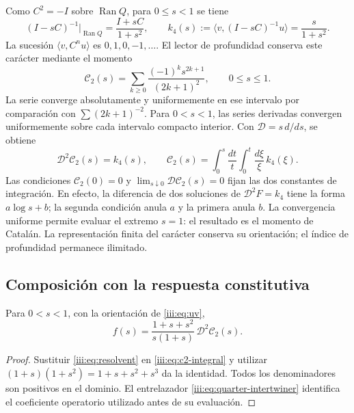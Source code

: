 Como $C^2=-I$ sobre $\operatorname{Ran}Q$, para $0\leq s<1$ se tiene
\begin{equation}
 (I-sC)^{-1}\big|_{\operatorname{Ran}Q}=\frac{I+sC}{1+s^2},
 \qquad k_4(s):=\langle v,(I-sC)^{-1}u\rangle=\frac{s}{1+s^2}.
 \label{iii:eq:resolvent}
\end{equation}
La sucesión $\langle v,C^nu\rangle$ es $0,1,0,-1,\ldots$. El lector
de profundidad conserva este carácter mediante el momento
\begin{equation}
 \mathcal C_2(s)=\sum_{k\geq0}\frac{(-1)^ks^{2k+1}}{(2k+1)^2},
 \qquad 0\leq s\leq1.
 \label{iii:eq:c2}
\end{equation}
La serie converge absolutamente y uniformemente en ese intervalo por
comparación con $\sum(2k+1)^{-2}$. Para $0<s<1$, las series derivadas
convergen uniformemente sobre cada intervalo compacto interior. Con
$\mathcal D=s\,d/ds$, se obtiene
\begin{equation}
 \mathcal D^2\mathcal C_2(s)=k_4(s),\qquad
 \mathcal C_2(s)=\int_0^s\frac{dt}{t}\int_0^t\frac{d\xi}{\xi}\,k_4(\xi).
 \label{iii:eq:c2-integral}
\end{equation}
Las condiciones $\mathcal C_2(0)=0$ y
$\lim_{s\downarrow0}\mathcal D\mathcal C_2(s)=0$ fijan las dos constantes
de integración. En efecto, la diferencia de dos soluciones de
$\mathcal D^2F=k_4$ tiene la forma $a\log s+b$; la segunda condición
anula $a$ y la primera anula $b$.
La convergencia uniforme permite evaluar el extremo $s=1$: el resultado es
el momento de Catalán. La representación finita del carácter conserva su
orientación; el índice de profundidad permanece ilimitado.

\subsection{Composición con la respuesta constitutiva}

\begin{theorem}
Para $0<s<1$, con la orientación de \eqref{iii:eq:uv},
\begin{equation}
 f(s)=\frac{1+s+s^2}{s(1+s)}\,\mathcal D^2\mathcal C_2(s).
 \label{iii:eq:catalan-vacuum}
\end{equation}
\end{theorem}
\begin{proof}
Sustituir \eqref{iii:eq:resolvent} en \eqref{iii:eq:c2-integral} y utilizar
$(1+s)(1+s^2)=1+s+s^2+s^3$ da la identidad. Todos los denominadores son
positivos en el dominio. El entrelazador \eqref{iii:eq:quarter-intertwiner}
identifica el coeficiente operatorio utilizado antes de su evaluación.
\end{proof}

